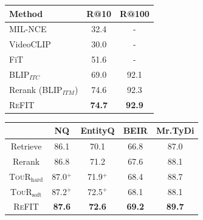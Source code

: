 \begin{minipage}[H]{.39\linewidth}
        \centering
        \scriptsize
        \setlength{\tabcolsep}{1.0em}
        \def\arraystretch{1.3}
        \begin{tabular}{l|c|c}
        \hline
            \textbf{Method} & \textbf{R@10} & \textbf{R@100} \\
            \hline
            MIL-NCE & 32.4 & - \\
            VideoCLIP  & 30.0 & - \\
            FiT  & 51.6 & - \\
            \hdashline
            BLIP$_{ITC}$ & 69.0 & 92.1 \\
            Rerank (BLIP$_{ITM}$) & 74.6 & 92.3\\
            \textsc{ReFIT} & \textbf{74.7} & \textbf{92.9} \\
            \hline
        \end{tabular}
        \label{tab:multimodal}
        \vspace{1.0em}
\end{minipage}
\hfill
\begin{minipage}[H]{.50\linewidth}
        \centering
        \scriptsize
        \setlength{\tabcolsep}{1.0em}
        \def\arraystretch{1.3}
        \begin{tabular}{c|c|c|c|c}
        \hline
            & \textbf{NQ} & \textbf{EntityQ} & \textbf{BEIR}& \textbf{Mr.TyDi} \\
            \hline
            Retrieve & 86.1 & 70.1 & 66.8 & 87.0  \\
            Rerank & 86.8 & 71.2 & 67.6 & 88.1  \\
            \textsc{TouR}$_{\text{hard}}$ & 87.0$^+$ & 71.9$^+$  & 68.4 & 88.7 \\
            \textsc{TouR}$_{\text{soft}}$ & 87.2$^+$ & 72.5$^+$ & 68.1 & 88.1\\
            \hline
            \textsc{ReFIT} & \textbf{87.6} & \textbf{72.6} & \textbf{69.2} &  \textbf{89.7} \\
            \hline
        \end{tabular}
        \label{tab:tour_comparison}
        \vspace{1em}
\end{minipage}

